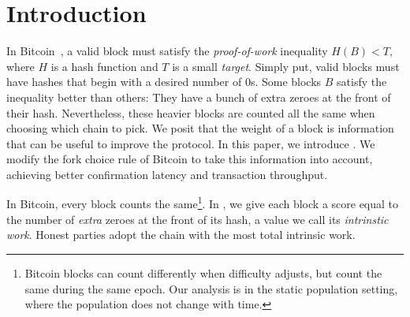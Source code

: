 \section{Introduction}

In Bitcoin~\cite{bitcoin}, a valid block must satisfy the
\emph{proof-of-work} inequality $H(B) < T$, where
$H$ is a hash function and $T$ is a small \emph{target}.
Simply put, valid blocks must have hashes that begin with a desired number of $0$s.
Some blocks $B$ satisfy the inequality better than others:
They have a bunch of extra zeroes at the front of their hash.
Nevertheless, these heavier blocks are counted all the same when choosing
which chain to pick.
We posit that the weight of a block is information
that can be useful to improve the protocol.
In this paper, we introduce \emph{\poem}.
We modify the fork choice rule of Bitcoin to take this information into account,
achieving better confirmation latency and transaction throughput.

\noindent
{}
In Bitcoin, every block counts the same\footnote{Bitcoin blocks can count differently when
difficulty adjusts, but count the same during the same epoch. Our analysis is in the
static population setting, where the population does not change with time.}.
In \poem, we give each block a score equal to the number of \emph{extra} zeroes at the front of its hash,
a value we call its \emph{intrinstic work}. Honest parties adopt the chain with the most total
intrinsic work.

